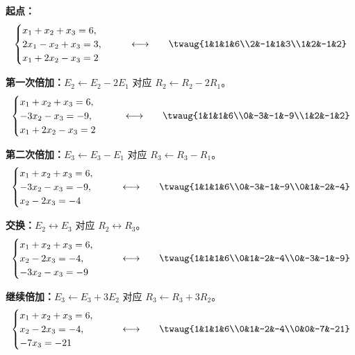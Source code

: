 \documentclass[a4paper,12pt,twoside,openany,fontset=none]{ctexbook}
\numberwithin{equation}{chapter}
\begin{document}
\textbf{起点：}
\[
 \begin{array}{c@{\qquad\longleftrightarrow\qquad}c}
 \begin{cases}x_1+x_2+x_3=6,\\2x_1-x_2+x_3=3,\\x_1+2x_2-x_3=2\end{cases}
 &\twaug{1&1&1&6\\2&-1&1&3\\1&2&-1&2}
 \end{array}
\]

\textbf{第一次倍加：}$E_2\leftarrow E_2-2E_1$ 对应 $R_2\leftarrow R_2-2R_1$。
\[
 \begin{array}{c@{\qquad\longleftrightarrow\qquad}c}
 \begin{cases}x_1+x_2+x_3=6,\\-3x_2-x_3=-9,\\x_1+2x_2-x_3=2\end{cases}
 &\twaug{1&1&1&6\\0&-3&-1&-9\\1&2&-1&2}
 \end{array}
\]

\textbf{第二次倍加：}$E_3\leftarrow E_3-E_1$ 对应 $R_3\leftarrow R_3-R_1$。
\[
 \begin{array}{c@{\qquad\longleftrightarrow\qquad}c}
 \begin{cases}x_1+x_2+x_3=6,\\-3x_2-x_3=-9,\\x_2-2x_3=-4\end{cases}
 &\twaug{1&1&1&6\\0&-3&-1&-9\\0&1&-2&-4}
 \end{array}
\]

\textbf{交换：}$E_2\leftrightarrow E_3$ 对应 $R_2\leftrightarrow R_3$。
\[
 \begin{array}{c@{\qquad\longleftrightarrow\qquad}c}
 \begin{cases}x_1+x_2+x_3=6,\\x_2-2x_3=-4,\\-3x_2-x_3=-9\end{cases}
 &\twaug{1&1&1&6\\0&1&-2&-4\\0&-3&-1&-9}
 \end{array}
\]

\textbf{继续倍加：}$E_3\leftarrow E_3+3E_2$ 对应 $R_3\leftarrow R_3+3R_2$。
\begin{equation}
\label{eq:two-main-echelon-matrix}
 \begin{array}{c@{\qquad\longleftrightarrow\qquad}c}
 \begin{cases}x_1+x_2+x_3=6,\\x_2-2x_3=-4,\\-7x_3=-21\end{cases}
 &\twaug{1&1&1&6\\0&1&-2&-4\\0&0&-7&-21}
 \end{array}
\end{equation}
\end{document}
